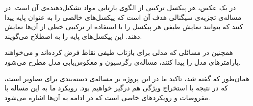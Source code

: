 \documentclass[11pt]{article}
\begin{document}
در یک عکس، هر  پیکسل‌ ترکیبی از الگوی بازتابی مواد تشکیل‌دهنده‌ی آن است. در مساله‌ی تجزیه‌ی سیگنالی
هدف آن است که پیکسل‌های خالصی را به عنوان پایه پیدا کنند که بتوانند نمایش طیفی هر پیکسل را با استفاده از ترکیبی خطی از آن‌ها نمایش دهند. این پیکسل‌های پایه را به اصطلاح 
\ememb{}
می‌گویند.

همچنین در مسائلی که مدلی برای بازتاب طیفی نقاط فرض کرده‌اند و می‌خواهند پارامترهای مدل را پیدا کنند، مساله‌ی رگرسیون و معکوس‌یابی مدل
مطرح می‌شود.


همان‌طور که گفته شد، تاکید ما در این پروژه بر مساله‌ی دسته‌بندی برای تصاویر \hyperspec{} است، که در نتیجه با استخراج ویژگی هم درگیر خواهیم بود. رویکرد ما به این مساله با مفروضات و رویکردهای خاصی است که در ادامه به آن‌ها اشاره می‌شود.
\end{document}
